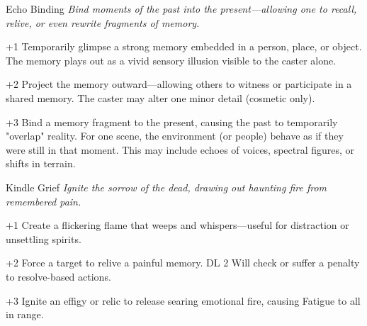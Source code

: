 \begin{WyrdSpell}[Bloodbinding]{Echo Binding}\label{spell:echo-binding}
    \textit{Bind moments of the past into the present—allowing one to recall, relive, or even rewrite fragments of memory.}
    
    \begin{WyrdSpellBlock}
        \item[+1] Temporarily glimpse a strong memory embedded in a person, place, or object. The memory plays out as a vivid sensory illusion visible to the caster alone.
        
        \item[+2] Project the memory outward—allowing others to witness or participate in a shared memory. The caster may alter one minor detail (cosmetic only).
        
        \item[+3] Bind a memory fragment to the present, causing the past to temporarily "overlap" reality. For one scene, the environment (or people) behave as if they were still in that moment. This may include echoes of voices, spectral figures, or shifts in terrain.
    \end{WyrdSpellBlock}
\end{WyrdSpell}



\begin{WyrdSpell}[Ashcraft]{Kindle Grief}\label{spell:kindle-grief}
\textit{Ignite the sorrow of the dead, drawing out haunting fire from remembered pain.}
    \begin{WyrdSpellBlock}
        \item[+1] Create a flickering flame that weeps and whispers—useful for distraction or unsettling spirits.
        \item[+2] Force a target to relive a painful memory. DL 2 Will check or suffer a penalty to resolve-based actions.
        \item[+3] Ignite an effigy or relic to release searing emotional fire, causing Fatigue to all in range.
    \end{WyrdSpellBlock}
\end{WyrdSpell}

